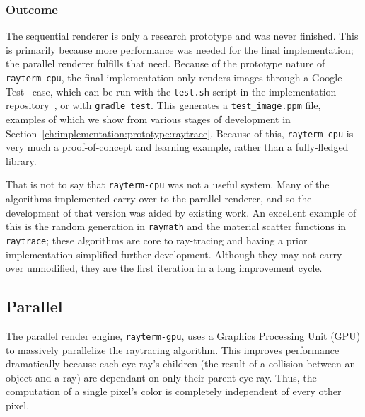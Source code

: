 \subsubsection{Outcome} \label{ch:methods:renderer:sequential:outcome}

The sequential renderer is only a research prototype and was never finished.
This is primarily because more performance was needed for the final \name{} implementation; the parallel renderer fulfills that need.
Because of the prototype nature of \texttt{rayterm-cpu}, the final implementation only renders images through a Google Test~\cite{googletest} case, which can be run with the \texttt{test.sh} script in the implementation repository~\cite{raytermCpuImpl}, or with \texttt{gradle test}.
This generates a \texttt{test\_image.ppm} file, examples of which we show from various stages of development in Section~\ref{ch:implementation:prototype:raytrace}.
Because of this, \texttt{rayterm-cpu} is very much a proof-of-concept and learning example, rather than a fully-fledged library.

That is not to say that \texttt{rayterm-cpu} was not a useful system.
Many of the algorithms implemented carry over to the parallel renderer, and so the development of that version was aided by existing work.
An excellent example of this is the random generation in \texttt{raymath} and the material scatter functions in \texttt{raytrace}; these algorithms are core to ray-tracing and having a prior implementation simplified further development.
Although they may not carry over unmodified, they are the first iteration in a long improvement cycle.

\subsection{Parallel} \label{ch:methods:renderer:parallel}

The parallel render engine, \texttt{rayterm-gpu}, uses a Graphics Processing Unit (GPU) to massively parallelize the raytracing algorithm.
This improves performance dramatically because each eye-ray's children (the result of a collision between an object and a ray) are dependant on only their parent eye-ray.
Thus, the computation of a single pixel's color is completely independent of every other pixel.

